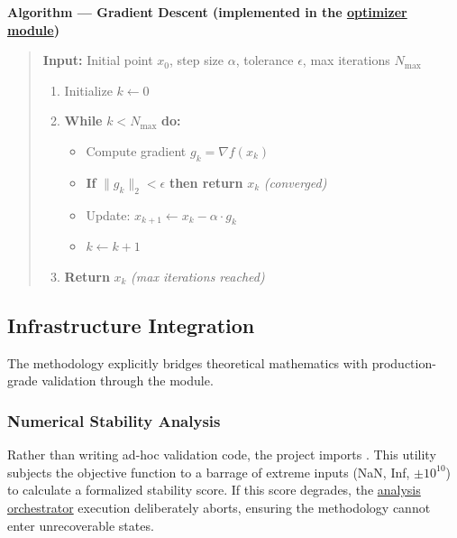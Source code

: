 \documentclass[
  english,
]{article}
\providecommand{\tightlist}{%
  \setlength{\itemsep}{0pt}\setlength{\parskip}{0pt}}
\begin{document}
\textbf{Algorithm --- Gradient Descent (implemented in the
\href{https://github.com/docxology/template/blob/main/projects/templates/template_code_project/src/optimizer.py\#L87-L173}{optimizer
module})}

\begin{quote}
\textbf{Input:} Initial point \(x_0\), step size \(\alpha\), tolerance
\(\epsilon\), max iterations \(N_{\max}\)

\begin{enumerate}
\def\labelenumi{\arabic{enumi}.}
\tightlist
\item
  Initialize \(k \leftarrow 0\)
\item
  \textbf{While} \(k < N_{\max}\) \textbf{do:}

  \begin{itemize}
  \tightlist
  \item
    Compute gradient \(g_k = \nabla f(x_k)\)
  \item
    \textbf{If} \(\|g_k\|_2 < \epsilon\) \textbf{then return} \(x_k\)
    \emph{(converged)}
  \item
    Update: \(x_{k+1} \leftarrow x_k - \alpha \cdot g_k\)
  \item
    \(k \leftarrow k + 1\)
  \end{itemize}
\item
  \textbf{Return} \(x_k\) \emph{(max iterations reached)}
\end{enumerate}
\end{quote}

\subsection{Infrastructure
Integration}\label{infrastructure-integration-1}

The methodology explicitly bridges theoretical mathematics with
production-grade validation through the
 module.

\subsubsection{Numerical Stability
Analysis}\label{numerical-stability-analysis}

Rather than writing ad-hoc validation code, the project imports
.
This utility subjects the objective function to a barrage of extreme
inputs (NaN, Inf, \(\pm 10^{10}\)) to calculate a formalized stability
score. If this score degrades, the
\href{https://github.com/docxology/template/blob/main/scripts/pipeline/stage_02_analysis.py}{analysis
orchestrator} execution deliberately aborts, ensuring the methodology
cannot enter unrecoverable states.
\end{document}
